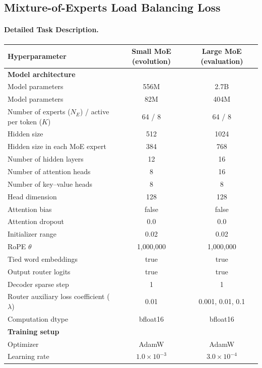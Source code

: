\clearpage
\subsection{Mixture-of-Experts Load Balancing Loss}

\paragraph{Detailed Task Description.}

\begin{table}[h]
\centering
\small
\begin{tabular}{lcc}
\toprule
\textbf{Hyperparameter} &
\textbf{Small MoE (evolution)} &
\textbf{Large MoE (evaluation)} \\
\midrule
\multicolumn{3}{l}{\textbf{Model architecture}} \\
\midrule
Model parameters & 556M & 2.7B \\
Model parameters & 82M & 404M \\
Number of experts ($N_E$) / active per token ($K$) & 64 / 8 & 64 / 8 \\
Hidden size & 512 & 1024 \\
Hidden size in each MoE expert & 384 & 768 \\
Number of hidden layers & 12 & 16 \\
Number of attention heads & 8 & 16 \\
Number of key--value heads & 8 & 8 \\
Head dimension & 128 & 128 \\
Attention bias & false & false \\
Attention dropout & 0.0 & 0.0 \\
Initializer range & 0.02 & 0.02 \\
RoPE $\theta$ & 1{,}000{,}000 & 1{,}000{,}000 \\
Tied word embeddings & true & true \\
Output router logits & true & true \\
Decoder sparse step & 1 & 1 \\
Router auxiliary loss coefficient ($\lambda$) & 0.01 & 0.001, 0.01, 0.1 \\
Computation dtype & bfloat16 & bfloat16 \\
\midrule
\multicolumn{3}{l}{\textbf{Training setup}} \\
\midrule
Optimizer & AdamW & AdamW \\
Learning rate & $1.0\times10^{-3}$ & $3.0\times10^{-4}$ \\

\end{tabular}
\end{table}
